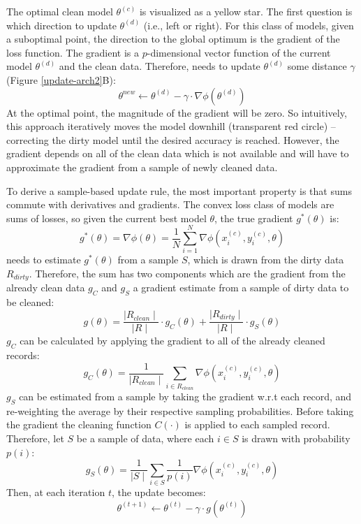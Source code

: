 The optimal clean model $\theta^{(c)}$ is visualized as a yellow star.
The first question is which direction to update $\theta^{(d)}$ (i.e., left or right).
For this class of models, given a suboptimal point, the direction to 
the global optimum is the gradient of the loss function.
The gradient is a $p$-dimensional vector function of the current model $\theta^{(d)}$ and the clean data.
Therefore, \sys needs to update $\theta^{(d)}$ some distance $\gamma$ (Figure \ref{update-arch2}B):
\[
\theta^{new} \leftarrow \theta^{(d)} - \gamma \cdot \nabla\phi(\theta^{(d)})
\]
At the optimal point, the magnitude of the gradient will be zero.
So intuitively, this approach iteratively moves the model downhill (transparent red circle) -- correcting the dirty model until the desired accuracy is reached.
However, the gradient depends on all of the clean data which is not available and \sys will have to approximate the gradient from a sample of newly cleaned data.

To derive a sample-based update rule, the most important property is that sums commute with derivatives and gradients.
The convex loss class of models are sums of losses, so given the current best model $\theta$, the true gradient $g^*(\theta)$ is:
\[
g^*(\theta) = \nabla\phi(\theta) = \frac{1}{N} \sum_{i=1}^N \nabla\phi(x_i^{(c)},y_i^{(c)},\theta)
\]
\sys needs to estimate $g^*(\theta)$ from a sample $S$, which is drawn from the dirty data $R_{dirty}$.
 Therefore, the sum has two components which are the gradient from the already clean data $g_C$ and $g_S$ a gradient estimate from a sample of dirty data to be cleaned:
\begin{equation}
g(\theta) = \frac{\mid R_{clean} \mid}{\mid R \mid} \cdot g_C(\theta) + \frac{\mid R_{dirty} \mid}{\mid R \mid} \cdot g_S(\theta)\label{unbia}
\end{equation}
$g_C$ can be calculated by applying the gradient to all of the already cleaned records:
\[
g_C(\theta) = \frac{1}{\mid R_{clean}\mid}\sum_{i \in R_{clean}}\nabla\phi(x_i^{(c)},y_i^{(c)},\theta)
\] 
$g_S$ can be estimated from a sample by taking the gradient w.r.t each record, and re-weighting the average by their respective sampling probabilities.
Before taking the gradient the cleaning function $C(\cdot)$ is applied to each sampled record.
Therefore, let $S$ be a sample of data, where each $i \in S$ is drawn with probability $p(i)$:
\[
g_{S}(\theta) = \frac{1}{\mid S \mid} \sum_{i \in S}\frac{1}{p(i)}\nabla\phi(x_i^{(c)},y_i^{(c)},\theta)
\]
Then, at each iteration $t$, the update becomes:
\[
\theta^{(t+1)} \leftarrow \theta^{(t)} - \gamma \cdot g(\theta^{(t)})
\]

